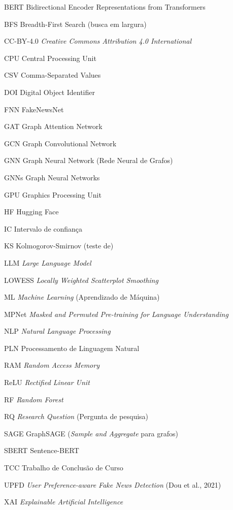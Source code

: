 \documentclass[12pt,oneside,a4paper]{abntex2}
\begin{document}
\imprimirlistadefiguras
\imprimirlistadetabelas

\begin{siglas}
\item[BERT] Bidirectional Encoder Representations from Transformers
\item[BFS] Breadth-First Search (busca em largura)
\item[CC-BY-4.0] \emph{Creative Commons Attribution 4.0 International}
\item[CPU] Central Processing Unit
\item[CSV] Comma-Separated Values
\item[DOI] Digital Object Identifier
\item[FNN] FakeNewsNet
\item[GAT] Graph Attention Network
\item[GCN] Graph Convolutional Network
\item[GNN] Graph Neural Network (Rede Neural de Grafos)
\item[GNNs] Graph Neural Networks
\item[GPU] Graphics Processing Unit
\item[HF] Hugging Face
\item[IC] Intervalo de confian\c{c}a
\item[KS] Kolmogorov-Smirnov (teste de)
\item[LLM] \emph{Large Language Model}
\item[LOWESS] \emph{Locally Weighted Scatterplot Smoothing}
\item[ML] \emph{Machine Learning} (Aprendizado de M\'aquina)
\item[MPNet] \emph{Masked and Permuted Pre-training for Language Understanding}
\item[NLP] \emph{Natural Language Processing}
\item[PLN] Processamento de Linguagem Natural
\item[RAM] \emph{Random Access Memory}
\item[ReLU] \emph{Rectified Linear Unit}
\item[RF] \emph{Random Forest}
\item[RQ] \emph{Research Question} (Pergunta de pesquisa)
\item[SAGE] GraphSAGE (\emph{Sample and Aggregate} para grafos)
\item[SBERT] Sentence-BERT
\item[TCC] Trabalho de Conclus\~ao de Curso
\item[UPFD] \emph{User Preference-aware Fake News Detection} (Dou et al., 2021)
\item[XAI] \emph{Explainable Artificial Intelligence}
\end{siglas}
\end{document}
